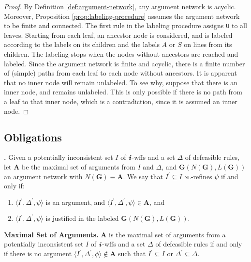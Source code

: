 \documentclass[10pt, conference, compsocconf]{IEEEtran}
\begin{document}
\begin{proof}
By Definition \ref{def:argument-network}, any argument network is acyclic. Moreover, Proposition \ref{prop:labeling-procedure} assumes the argument network to be finite and connected. The first rule in the labeling procedure assigns $\texttt{U}$ to all leaves. Starting from each leaf, an ancestor node is considered, and is labeled according to the labels on its children and the labels $A$ or $S$ on lines from its children. The labeling stops when the nodes without ancestors are reached and labeled. Since the argument network is finite and acyclic, there is a finite number of (simple) paths from each leaf to each node without ancestors. It is apparent that no inner node will remain unlabeled. To see why, suppose that there is an inner node, and remains unlabeled. This is only possible if there is no path from a leaf to that inner node, which is a contradiction, since it is assumed an inner node. 
\end{proof}


\subsection{Obligations}\label{sect:nlref:obligations}
\begin{definition}\label{def:nl-refinement}
\textbf{\nlref.} Given a potentially inconsistent set $I$ of $\textbf{\textit{i}}$-wffs and a set $\Delta$ of defeasible rules, let $\textbf{A}$ be the maximal set of arguments from $I$ and $\Delta$, and $\textbf{G}(N(\textbf{G}), L(\textbf{G}))$ an argument network with $N(\textbf{G}) \equiv \textbf{A}$. We say that $I^{\prime} \subseteq I$ \textsc{nl}-refines $\psi$ if and only if:
	\begin{enumerate}
		\item{$\langle I^{\prime}, \Delta^{\prime}, \psi \rangle$ is an argument, and $\langle I^{\prime}, \Delta^{\prime}, \psi \rangle \in \textbf{A}$, and}
		\item{$\langle I^{\prime}, \Delta^{\prime}, \psi \rangle$ is justified in the labeled $\textbf{G}(N(\textbf{G}), L(\textbf{G}))$.}
	\end{enumerate}
\end{definition}

\begin{definition}\label{def:maximal-arguments}
\textbf{Maximal Set of Arguments.} $\textbf{A}$ is the maximal set of arguments from a potentially inconsistent set $I$ of $\textbf{\textit{i}}$-wffs and a set $\Delta$ of defeasible rules if and only if there is no argument $\langle I^{\prime}, \Delta^{\prime}, \phi \rangle \notin \textbf{A}$ such that $I^{\prime} \subseteq I$ or $\Delta^{\prime} \subseteq \Delta$.
\end{definition}
\end{document}
